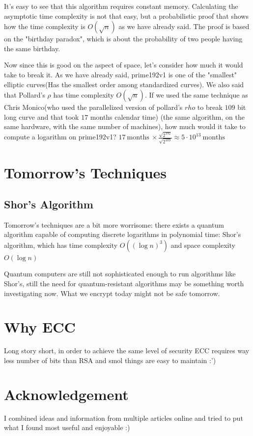 \documentclass{article}
\begin{document}
It's easy to see that this algorithm requires constant memory. Calculating the asymptotic time complexity is not that easy, but a probabilistic proof that shows how the time complexity is $O(\sqrt{n})$ as we have already said. The proof is based on the "birthday paradox", which is about the probability of two people having the same birthday.

Now since this is good on the aspect of space, let's consider how much it would take to break it. As we have already said, prime192v1 is one of the "smallest" elliptic curves(Has the smallest order among standardized curves). We also said that Pollard's $\rho$ has  time complexity $O(\sqrt{n})$. If we used the same technique as Chris Monico(who used the parallelized version of pollard's $rho$ to break $109$ bit long curve and that took $17$ months calendar time) (the same algorithm, on the same hardware, with the same number of machines), how much would it take to compute a logarithm on prime192v1?
$17\ \text{months}\ \times \frac{\sqrt{2^{192}}}{\sqrt{2^{109}}} \approx 5 \cdot 10^{13}\ \text{months}$
\section{Tomorrow's Techniques}
\subsection{Shor's Algorithm}
Tomorrow's techniques are a bit more worrisome: there exists a quantum algorithm capable of computing discrete logarithms in polynomial time: Shor's algorithm, which has time complexity $O((\log n)^3)$ and space complexity $O(\log n)$

Quantum computers are still not sophisticated enough to run algorithms like Shor's, still the need for quantum-resistant algorithms may be something worth investigating now. What we encrypt today might not be safe tomorrow.
\section{Why ECC}
Long story short, in order to achieve the same level of security ECC requires way less number of bits than RSA and smol things are easy to maintain :')
\section{Acknowledgement}
I combined ideas and information from multiple articles online and tried to put what I found most useful and enjoyable :)
\end{document}
